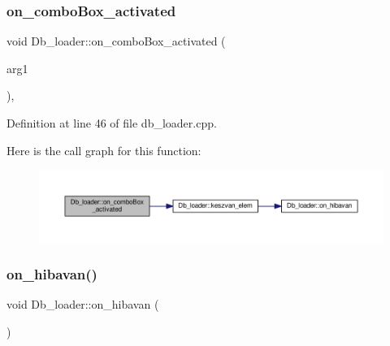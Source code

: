 \mbox{\label{classDb__loader_af4abb62f67a8c249ddd84a78966acd8b}} 
\subsubsection{\texorpdfstring{on\+\_\+combo\+Box\+\_\+activated}{on\_comboBox\_activated}}
{\footnotesize\ttfamily void Db\+\_\+loader\+::on\+\_\+combo\+Box\+\_\+activated (\begin{DoxyParamCaption}\item[{const Q\+String \&}]{arg1 }\end{DoxyParamCaption})\hspace{0.3cm}{\ttfamily [private]}, {\ttfamily [slot]}}



Definition at line 46 of file db\+\_\+loader.\+cpp.

Here is the call graph for this function\+:\nopagebreak
\begin{figure}[H]
\begin{center}
\leavevmode
\includegraphics[width=350pt]{classDb__loader_af4abb62f67a8c249ddd84a78966acd8b_cgraph}
\end{center}
\end{figure}
\mbox{\label{classDb__loader_aebf68b20ad5c3c7bac822b7c41f4e4ff}} 
\subsubsection{\texorpdfstring{on\+\_\+hibavan()}{on\_hibavan()}}
{\footnotesize\ttfamily void Db\+\_\+loader\+::on\+\_\+hibavan (\begin{DoxyParamCaption}{ }\end{DoxyParamCaption})\hspace{0.3cm}{\ttfamily [private]}}



